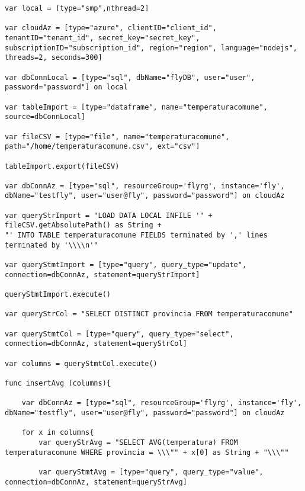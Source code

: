 \begin{lstlisting}[language=FLY,caption={Calcolo della temperatura media delle province della Campania su Azure utilizzando funzioni Serverless in JavaScript.}, label={lst:dbInteraction}]
var local = [type="smp",nthread=2]

var cloudAz = [type="azure", clientID="client_id", tenantID="tenant_id", secret_key="secret_key", subscriptionID="subscription_id", region="region", language="nodejs", threads=2, seconds=300]

var dbConnLocal = [type="sql", dbName="flyDB", user="user", password="password"] on local

var tableImport = [type="dataframe", name="temperaturacomune", source=dbConnLocal]

var fileCSV = [type="file", name="temperaturacomune", path="/home/temperaturacomune.csv", ext="csv"]

tableImport.export(fileCSV)

var dbConnAz = [type="sql", resourceGroup='flyrg', instance='fly', dbName="testfly", user="user@fly", password="password"] on cloudAz

var queryStrImport = "LOAD DATA LOCAL INFILE '" + fileCSV.getAbsolutePath() as String + 
"' INTO TABLE temperaturacomune FIELDS terminated by ',' lines terminated by '\\\\n'"

var queryStmtImport = [type="query", query_type="update", connection=dbConnAz, statement=queryStrImport]

queryStmtImport.execute()

var queryStrCol = "SELECT DISTINCT provincia FROM temperaturacomune"

var queryStmtCol = [type="query", query_type="select", connection=dbConnAz, statement=queryStrCol]

var columns = queryStmtCol.execute()

func insertAvg (columns){
    
    var dbConnAz = [type="sql", resourceGroup='flyrg', instance='fly', dbName="testfly", user="user@fly", password="password"] on cloudAz
    
    for x in columns{
        var queryStrAvg = "SELECT AVG(temperatura) FROM temperaturacomune WHERE provincia = \\\"" + x[0] as String + "\\\""
        
        var queryStmtAvg = [type="query", query_type="value", connection=dbConnAz, statement=queryStrAvg]
        

\end{lstlisting}
